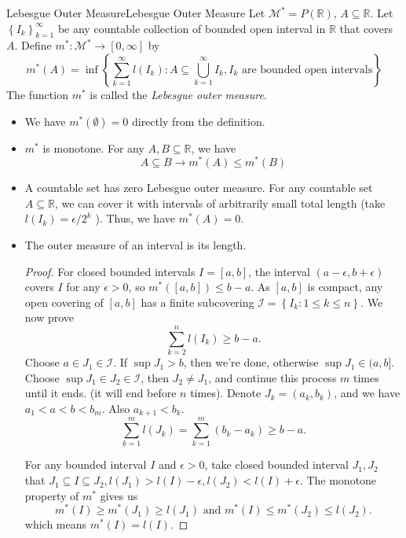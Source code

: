 \documentclass[../main.tex]{subfiles}
\begin{document}
\begin{definition}{Lebesgue Outer Measure}{Lebesgue Outer Measure}
Let $\mathcal{M}^* = P(\mathbb{R})$, $A \subseteq \mathbb{R}$. Let $\left\{ I_k \right\}_{k=1}^{\infty }$ be any countable collection of bounded open interval in $\mathbb{R}$ that covers $A$. Define $m^* : \mathcal{M}^* \rightarrow [0,\infty ]$ by
	\begin{equation*}
		m^*(A) = \inf \left\{ \sum_{k=1}^{\infty } l(I_k) : A \subseteq \bigcup_{k=1}^{\infty } I_k, I_k \text{ are bounded open intervals} \right\}
	\end{equation*}
	The function $m^*$ is called the \emph{Lebesgue outer measure}.
\end{definition}
\begin{itemize}
\item We have $m^*(\emptyset )=0$ directly from the definition.
\item $m^*$ is monotone. For any $A,B \subseteq \mathbb{R}$, we have
	\begin{equation*}
		A \subseteq B \rightarrow m^*(A) \leq m^*(B)
	\end{equation*}
\item A countable set has zero Lebesgue outer measure. For any countable set $A \subseteq \mathbb{R}$, we can cover it with intervals of arbitrarily small total length (take $l(I_k) = \epsilon / 2^k$ ). Thus, we have $m^*(A)=0$.
\item The outer measure of an interval is its length.
	\begin{proof}
		For closed bounded intervals $I = [a, b]$, the interval $(a-\epsilon,b+\epsilon)$ covers $I$ for any $\epsilon>0$, so $m^*([a,b]) \leq b-a$. As $[a,b]$ is compact, any open covering of $[a,b]$ has a finite subcovering $\mathcal{I} = \left\{ I_k: 1\leq k\leq n \right\}$. We now prove
		\begin{equation*}
		\sum_{k=2}^{n} l(I_k) \geq b-a.
		\end{equation*}
		Choose $a\in J_1\in \mathcal{I}$. If $\sup J_1>b$, then we're done, otherwise $\sup J_1\in (a,b]$. Choose $\sup J_1\in J_2\in \mathcal{I}$, then $J_2\neq J_1$, and continue this process $m$ times until it ends. (it will end before $n$ times). Denote $J_k = (a_k,b_k)$, and we have $a_1<a<b<b_m$. Also $a _{k+1} < b_k$.
		\begin{equation*}
			\sum_{k=1}^{m} l(J_k) = \sum_{k=1}^{m} (b_k-a_k) \geq b-a.
		\end{equation*}

		For any bounded interval $I$ and $\epsilon>0$, take closed bounded interval $J_1,J_2$ that $J_1 \subseteq I \subseteq J_2, l(J_1)> l(I)- \epsilon, l(J_2)<l(I)+ \epsilon$. The monotone property of $m^*$ gives us
		\begin{equation*}
			m^*(I) \geq m^*(J_1) \geq l(J_1) \text{ and } m^*(I) \leq m^*(J_2) \leq l(J_2).
		\end{equation*}
		which means $m^*(I) = l(I)$.


\end{proof}
\end{itemize}
\end{document}

